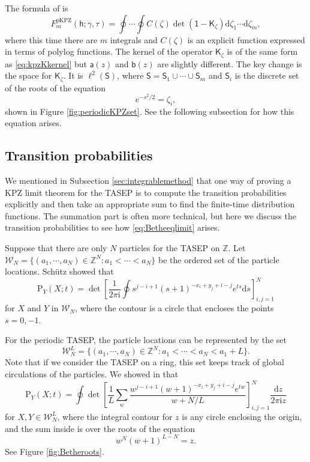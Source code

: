 \documentclass[10pt]{article}
\theoremstyle{plain}
\theoremstyle{definition}
\newcommand{\beq}{ \begin{equation} }
\newcommand{\eeq}{ \end{equation} }
\newcommand{\beqq}{ \begin{equation*} }
\newcommand{\eeqq}{ \end{equation*} }
\newcommand{\dd}{\mathrm{d}}
\newcommand{\ii}{\mathrm{i}}
\newcommand{\Z}{\mathbb{Z}}
\newcommand{\Prob}{\mathrm{P}}    %
\newcommand{\pkmath}{\mathsf}  %
\newcommand{\pkFdist}{F^{\mathrm{pKPZ}}} %
\newcommand{\pkCdisc}{C}  %
\newcommand{\pkt}{\tau} %
\newcommand{\pkga}{\gamma} %
\newcommand{\pkh}{\pkmath{h}}  %
\newcommand{\pK}{\pkmath{K}}  %
\newcommand{\pid}{\pkmath{1}}  %
\newcommand{\pspace}{\pkmath{S}}  %
\newcommand{\kmath}{\mathsf}  %
\newcommand{\ka}{\kmath{a}}  %
\newcommand{\kb}{\kmath{b}}  %
\numberwithin{equation}{section}
\begin{document}
The formula of \cite{Baik-Liu19} is 
\beq \label{eq:PKPZformula}
	\pkFdist_m(\pkh; \pkga, \pkt)
	= \oint \cdots \oint  \pkCdisc(\zeta) \det(\pid-\pK_\zeta)   \dd \zeta_1 \cdots \dd \zeta_{m}, 
\eeq
where this time there are $m$ integrals and $\pkCdisc(\zeta)$ is an explicit function expressed in terms of polylog functions. 
The kernel of the operator $\pK_\zeta$ is of the same form as \eqref{eq:kpzKkernel} but $\ka(z)$ and $\kb(z)$ are slightly different. 
The key change is the space for $\pK_{\zeta}$. It is $\ell^2(\pspace)$, where
$\pspace= \pspace_1\cup\cdots \cup \pspace_m$ and $\pspace_i$ is the discrete set of the roots of the equation 
\beq \label{eq:Betheeqlimit}
	e^{-s^2/2}= \zeta_i , 
\eeq
shown in Figure \ref{fig:periodicKPZset}. 
See the following subsection for how this equation arises. 


\subsection{Transition probabilities} \label{sec:Bethe}


We mentioned in Subsection \ref{sec:integrablemethod} that one way of proving a KPZ limit theorem for the TASEP is to compute the transition probabilities explicitly and then take an appropriate sum to find the finite-time distribution functions. 
The summation part is often more technical, but here we discuss the transition probabilities to see how \eqref{eq:Betheeqlimit} arises. 
 
Suppose that there are only $N$ particles for the TASEP on $\Z$. 
Let $\mathcal{W}_N= \{ (a_1, \cdots, a_N)\in \Z^N: a_1<\cdots< a_N\}$ be the ordered set of the particle locations. 
Sch\"utz \cite{Schutz97} showed that 
\beq \label{eq:tranpro}
	\Prob_{Y}(X; t) =  \det \left[ \frac1{2\pi \ii} \oint s^{j-i+1}(s+1)^{-x_i+y_j+i-j} e^{ts} \dd s \right]_{i,j=1}^N 
\eeq
for $X$ and $Y$ in $\mathcal{W}_N$, where the contour is a circle that encloses the points $s=0,-1$. 

For the periodic TASEP, the particle locations can be represented by the set 
\beqq
	\mathcal{W}_N^L=  \{ (a_1, \cdots, a_N)\in \Z^N: a_1<\cdots< a_N <a_1+L\} . 
\eeqq
Note that if we consider the TASEP on a ring, this set keeps track of global circulations of the particles. 
We showed in \cite{Baik-Liu18} that 
\beq \label{eq:transprofper}
	\Prob_{Y}(X; t) = \oint \det \left[ \frac1{L} \sum_{w} \frac{w^{j-i+1}(w+1)^{-x_i+y_j+i-j} e^{tw}}{w+N/L} \right]_{i,j=1}^N  \frac{\dd z}{2\pi \ii z}
\eeq
for $X, Y\in \mathcal{W}_N^L$, where the integral contour for $z$ is any circle enclosing the origin, and the sum inside is over the roots of the equation 
\beq \label{eq:Betheequation}
	w^N (w+1)^{L-N}=z . 
\eeq 
See Figure \ref{fig:Betheroots}. 
\end{document}
